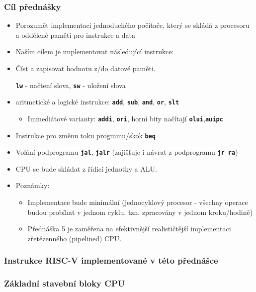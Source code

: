 \documentclass{beamer}
\begin{document}
\begin{frame}
\frametitle{Cíl přednášky}

\begin{itemize}
\item Porozumět implementaci jednoduchého počítače, který se skládá z
procesoru a oddělené paměti pro instrukce a data
\item Naším cílem je implementovat následující instrukce:
\item Číst a zapisovat hodnotu z/do datové paměti.
\begin{itemize}
\textbf{\texttt{lw}} - načtení slova, \textbf{\texttt{sw}} - uložení slova
\end{itemize}
\item aritmetické a logické instrukce: \textbf{\texttt{add}}, \textbf{\texttt{sub}}, \textbf{\texttt{and}}, \textbf{\texttt{or}}, \textbf{\texttt{slt}}
\begin{itemize}
\item Immediátové varianty: \textbf{\texttt{addi}}, \textbf{\texttt{ori}}, horní bity načítají \textbf{\texttt{olui}},\textbf{\texttt{auipc}}
\end{itemize}
\item Instrukce pro změnu toku programu/skok \textbf{\texttt{beq}}
\item Volání podprogramu \textbf{\texttt{jal}}, \textbf{\texttt{jalr}} (zajišťuje i návrat z podprogramu \textbf{\texttt{jr~ra}})
\item CPU se bude skládat z řídicí jednotky a ALU.
\item Poznámky:
\begin{itemize}
\item Implementace bude minimální (jednocyklový procesor - všechny operace budou probíhat v jednom cyklu, tzn.
zpracovány v jednom kroku/hodině)
\item Přednáška 5 je zaměřena na efektivnější realističtější implementaci zřetězenného (pipelined) CPU.
\end{itemize}
\end{itemize}

\end{frame}


\begin{frame}
\frametitle{Instrukce RISC-V implementované v této přednášce}


\end{frame}


\begin{frame}
\frametitle{Základní stavební bloky CPU}


\end{frame}
\end{document}
